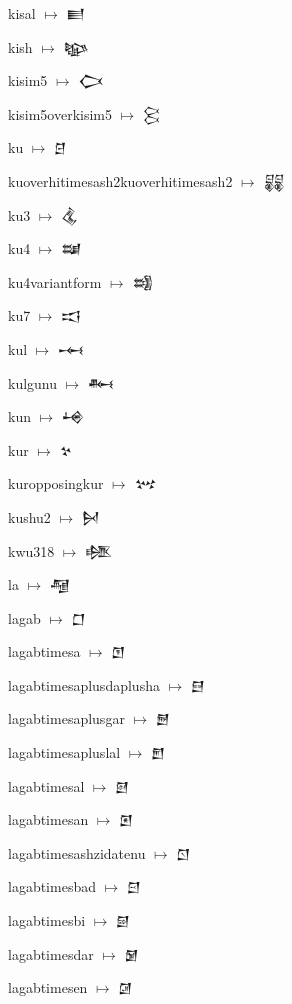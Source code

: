 {\noindent kisal $\mapsto$ {\cufont 𒆦}\par
\noindent kish $\mapsto$ {\cufont 𒆧}\par
\noindent kisim5 $\mapsto$ {\cufont 𒆨}\par
\noindent kisim5overkisim5 $\mapsto$ {\cufont 𒆩}\par
\noindent ku $\mapsto$ {\cufont 𒆪}\par
\noindent kuoverhitimesash2kuoverhitimesash2 $\mapsto$ {\cufont 𒆫}\par
\noindent ku3 $\mapsto$ {\cufont 𒆬}\par
\noindent ku4 $\mapsto$ {\cufont 𒆭}\par
\noindent ku4variantform $\mapsto$ {\cufont 𒆮}\par
\noindent ku7 $\mapsto$ {\cufont 𒆯}\par
\noindent kul $\mapsto$ {\cufont 𒆰}\par
\noindent kulgunu $\mapsto$ {\cufont 𒆱}\par
\noindent kun $\mapsto$ {\cufont 𒆲}\par
\noindent kur $\mapsto$ {\cufont 𒆳}\par
\noindent kuropposingkur $\mapsto$ {\cufont 𒆴}\par
\noindent kushu2 $\mapsto$ {\cufont 𒆵}\par
\noindent kwu318 $\mapsto$ {\cufont 𒆶}\par
\noindent la $\mapsto$ {\cufont 𒆷}\par
\noindent lagab $\mapsto$ {\cufont 𒆸}\par
\noindent lagabtimesa $\mapsto$ {\cufont 𒆹}\par
\noindent lagabtimesaplusdaplusha $\mapsto$ {\cufont 𒆺}\par
\noindent lagabtimesaplusgar $\mapsto$ {\cufont 𒆻}\par
\noindent lagabtimesapluslal $\mapsto$ {\cufont 𒆼}\par
\noindent lagabtimesal $\mapsto$ {\cufont 𒆽}\par
\noindent lagabtimesan $\mapsto$ {\cufont 𒆾}\par
\noindent lagabtimesashzidatenu $\mapsto$ {\cufont 𒆿}\par
\noindent lagabtimesbad $\mapsto$ {\cufont 𒇀}\par
\noindent lagabtimesbi $\mapsto$ {\cufont 𒇁}\par
\noindent lagabtimesdar $\mapsto$ {\cufont 𒇂}\par
\noindent lagabtimesen $\mapsto$ {\cufont 𒇃}\par
}
